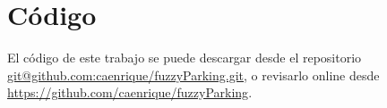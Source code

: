 \section{Código}
El código de este trabajo se puede descargar desde el repositorio
\url{git@github.com:caenrique/fuzzyParking.git}, o revisarlo online
desde \url{https://github.com/caenrique/fuzzyParking}.